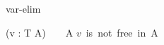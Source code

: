 \begin{circuslaw}{var-elim}
\begin{circusaction*}
  (\circvar v : T \circspot A) ~ \equiv ~ A
  \also
  \provided \; \mbox{$v$ is not free in A}
\end{circusaction*}
\end{circuslaw}
